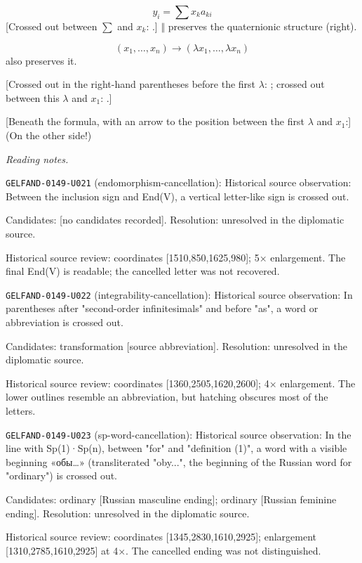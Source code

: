 \begin{equation*}
y_i=\sum x_k a_{ki}
\end{equation*}
[Crossed out between $\sum$ and $x_k$:
.]
$\Vert$ preserves the quaternionic structure (right).

\begin{equation*}
(x_1,\ldots,x_n)\to(\lambda x_1,\ldots,\lambda x_n)
\end{equation*}
also preserves it.

[Crossed out in the right-hand parentheses before the first $\lambda$:
;
crossed out between this $\lambda$ and $x_1$:
.]

[Beneath the formula, with an arrow to the position between the first $\lambda$ and $x_1$:]
(On the other side!)


\par\smallskip\noindent\textit{Reading notes.}\par
\noindent\texttt{GELFAND-0149-U021} (endomorphism-cancellation): Historical source observation: Between the inclusion sign and End(V), a vertical letter-like sign is crossed out.\par
Candidates: [no candidates recorded]. Resolution: unresolved in the diplomatic source.\par
Historical source review: coordinates [1510,850,1625,980]; 5× enlargement. The final End(V) is readable; the cancelled letter was not recovered.\par

\noindent\texttt{GELFAND-0149-U022} (integrability-cancellation): Historical source observation: In parentheses after "second-order infinitesimals" and before "as", a word or abbreviation is crossed out.\par
Candidates: transformation [source abbreviation]. Resolution: unresolved in the diplomatic source.\par
Historical source review: coordinates [1360,2505,1620,2600]; 4× enlargement. The lower outlines resemble an abbreviation, but hatching obscures most of the letters.\par

\noindent\texttt{GELFAND-0149-U023} (sp-word-cancellation): Historical source observation: In the line with Sp(1)·Sp(n), between "for" and "definition (1)", a word with a visible beginning «обы…» (transliterated "oby...", the beginning of the Russian word for "ordinary") is crossed out.\par
Candidates: ordinary [Russian masculine ending]; ordinary [Russian feminine ending]. Resolution: unresolved in the diplomatic source.\par
Historical source review: coordinates [1345,2830,1610,2925]; enlargement [1310,2785,1610,2925] at 4×. The cancelled ending was not distinguished.\par

